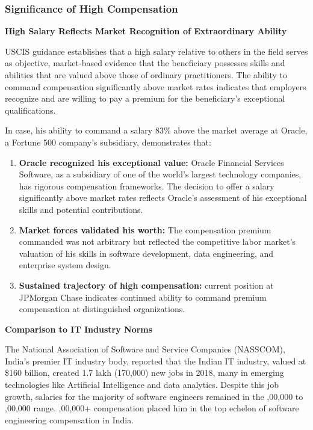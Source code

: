 
\subsubsection{Significance of \drs High Compensation}
\label{salary:significance}

\textbf{High Salary Reflects Market Recognition of Extraordinary Ability}

USCIS guidance establishes that a high salary relative to others in the field serves as objective, market-based evidence that the beneficiary possesses skills and abilities that are valued above those of ordinary practitioners. The ability to command compensation significantly above market rates indicates that employers recognize and are willing to pay a premium for the beneficiary's exceptional qualifications.

In \drs case, his ability to command a salary 83\% above the market average at Oracle, a Fortune 500 company's subsidiary, demonstrates that:

\begin{enumerate}
    \item \textbf{Oracle recognized his exceptional value:} Oracle Financial Services Software, as a subsidiary of one of the world's largest technology companies, has rigorous compensation frameworks. The decision to offer \dr a salary significantly above market rates reflects Oracle's assessment of his exceptional skills and potential contributions.
    
    \item \textbf{Market forces validated his worth:} The compensation premium \dr commanded was not arbitrary but reflected the competitive labor market's valuation of his skills in software development, data engineering, and enterprise system design.
    
    \item \textbf{Sustained trajectory of high compensation:} \drs current position at JPMorgan Chase indicates continued ability to command premium compensation at distinguished organizations.
\end{enumerate}

\textbf{Comparison to IT Industry Norms}

The National Association of Software and Service Companies (NASSCOM), India's premier IT industry body, reported that the Indian IT industry, valued at \$160 billion, created 1.7 lakh (170,000) new jobs in 2018, many in emerging technologies like Artificial Intelligence and data analytics. Despite this job growth, salaries for the majority of software engineers remained in the ,00,000 to ,00,000 range. \drs {},00,000+ compensation placed him in the top echelon of software engineering compensation in India.

